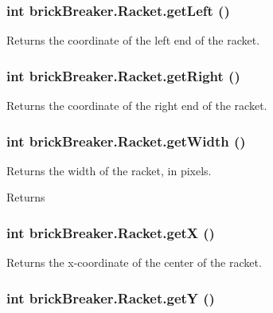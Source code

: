 \hypertarget{classbrick_breaker_1_1_racket_a8d29bc2897ed97686e2be3e96308629b}{
\subsubsection[{getLeft}]{\setlength{\rightskip}{0pt plus 5cm}int brickBreaker.Racket.getLeft ()}}
\label{classbrick_breaker_1_1_racket_a8d29bc2897ed97686e2be3e96308629b}
Returns the coordinate of the left end of the racket. \hypertarget{classbrick_breaker_1_1_racket_ad947f4853fbe782ab81e5a90e87ec360}{
\subsubsection[{getRight}]{\setlength{\rightskip}{0pt plus 5cm}int brickBreaker.Racket.getRight ()}}
\label{classbrick_breaker_1_1_racket_ad947f4853fbe782ab81e5a90e87ec360}
Returns the coordinate of the right end of the racket. \hypertarget{classbrick_breaker_1_1_racket_a32acec6ccc8fd726507697371bcde2c0}{
\subsubsection[{getWidth}]{\setlength{\rightskip}{0pt plus 5cm}int brickBreaker.Racket.getWidth ()}}
\label{classbrick_breaker_1_1_racket_a32acec6ccc8fd726507697371bcde2c0}
Returns the width of the racket, in pixels. \begin{DoxyReturn}{Returns}

\end{DoxyReturn}
\hypertarget{classbrick_breaker_1_1_racket_ac70c03dfe6eff9485e79e1430a0a2ab0}{
\subsubsection[{getX}]{\setlength{\rightskip}{0pt plus 5cm}int brickBreaker.Racket.getX ()}}
\label{classbrick_breaker_1_1_racket_ac70c03dfe6eff9485e79e1430a0a2ab0}
Returns the x-\/coordinate of the center of the racket. \hypertarget{classbrick_breaker_1_1_racket_a229e48b5cacbc3921f8c626b77489e9b}{
\subsubsection[{getY}]{\setlength{\rightskip}{0pt plus 5cm}int brickBreaker.Racket.getY ()}}
